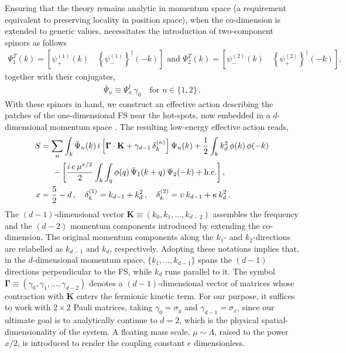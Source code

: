 Ensuring that the theory remains analytic in momentum space (a 
requirement equivalent to preserving locality in position space), when the 
co-dimension is extended to generic values, necessitates the introduction 
of two-component spinors as follows \cite{Lee-Dalid, ips-uv-ir1,ips-cavity}
\begin{align}
\Psi_1^T(k) = \left[\psi_{+}^{(1)}(k) \quad 
\left\{\psi_{-}^{(1)}\right\}^\dagger(-k)\right]
\text{ and }
\Psi_2^T(k) = \left[\psi_{-}^{(2)}(k) \quad 
\left\{\psi_{+}^{(2)}\right\}^\dagger(-k)\right],
\end{align}
together with their conjugates,
\begin{align}
\bar{\Psi}_n \equiv \Psi_n^\dagger\,\gamma_0 \quad \text{for } 
n \in \{1, 2\}\,.
\end{align}
With these spinors in hand, we construct an effective action describing 
the patches of the one-dimensional FS near the hot-spots, now embedded 
in a $d$-dimensional momentum space \cite{Lee-Dalid, ips-uv-ir1, ips-u1, 
ips-2kf, ips-fflo}. The resulting low-energy effective action reads,
\begin{align}
\label{eqs1}
S  &=   \sum_n  \int_k \bar \Psi_n  (k) \,i
\left [  \mathbf  \Gamma \cdot \mathbf  K  +  \gamma_{d-1} \, \delta_k^{(n)} \right  ] \Psi_n (k)  
 +
 \frac{1}{2}\int_k k_d^2 \,  \phi (k) \, \phi (-k) 
 \nonumber \\ & \hspace{ 0.5 cm } 
- \left[ 
\frac{ i\, e \, \mu^{x/2} } {2} 
\int_{k} \int_q \phi (q) \,
 \bar{\Psi}_1 (k+q) \, {\Psi}_2(-k) 
+ \text{h.c.} \right ] ,
\nonumber \\ x &=  \frac{ 5 } {2} - d \,, \quad 
\delta_k^{(1)} = k_{d-1} +  k_d^2 \,, \quad
\delta_k^{(2)} = \upsilon \,  k_{d-1} + \kappa\, k_d^2 \,.
\end{align}
The $(d-1)$-dimensional vector $\mathbf{K} \equiv (k_0, k_1, \ldots, 
k_{d-2})$ assembles the frequency and the $(d-2)$ momentum components 
introduced by extending the co-dimension. The original momentum 
components along the $k_1$- and $k_2$-directions are relabelled as 
$k_{d-1}$ and $k_d$, respectively. Adopting these notations implies that, in the
$d$-dimensional momentum space, $\{k_1, \ldots, k_{d-1}\}$ spans the 
$(d-1)$ directions perpendicular to the FS, while $k_d$ runs parallel 
to it. The symbol $\boldsymbol{\Gamma} \equiv (\gamma_0, \gamma_1, 
\ldots, \gamma_{d-2})$ denotes a $(d-1)$-dimensional vector of matrices 
whose contraction with $\mathbf{K}$ enters the fermionic kinetic term. 
For our purpose, it suffices to work with $2 \times 2$ Pauli 
matrices, taking $\gamma_0 = \sigma_y$ and $\gamma_{d-1} = \sigma_x$, 
since our ultimate goal is to analytically continue to $d = 2$, which is the 
physical spatial-dimensionality of the system. A floating mass scale, 
$\mu \sim \Lambda$, raised to the power $x/2$, is introduced to render 
the coupling constant $e$ dimensionless.

